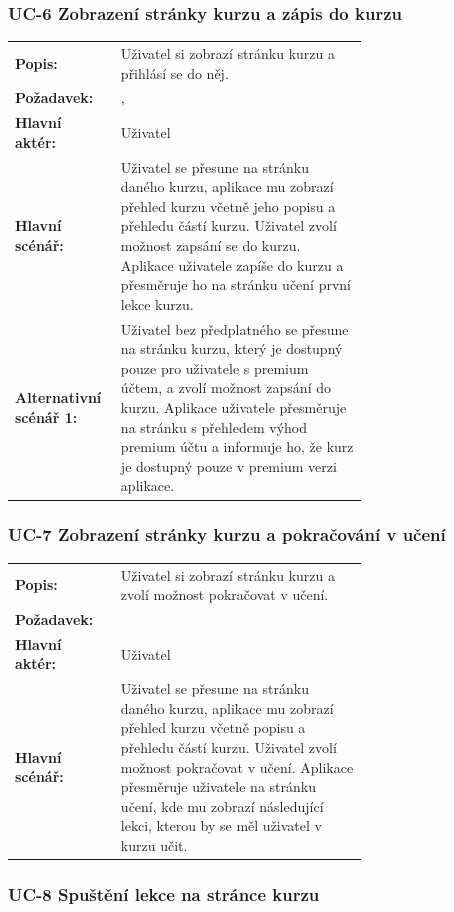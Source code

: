 \subsubsection{UC-6 Zobrazení stránky kurzu a zápis do kurzu}

\begin{tabular}{lp{0.7\linewidth}}
  \textbf{Popis:} & Uživatel si zobrazí stránku kurzu a přihlásí se do něj. \\
  \textbf{Požadavek:} & \nameref{sec:fp-course-page}, \nameref{sec:fp-subscription-system} \\
  \textbf{Hlavní aktér:} & Uživatel \\
  \textbf{Hlavní scénář:} & Uživatel se přesune na stránku daného kurzu, aplikace mu zobrazí přehled kurzu včetně jeho popisu a přehledu částí kurzu. Uživatel zvolí možnost zapsání se do kurzu. Aplikace uživatele zapíše do kurzu a přesměruje ho na stránku učení první lekce kurzu. \\
  \textbf{Alternativní scénář 1:} & Uživatel bez předplatného se přesune na stránku kurzu, který je dostupný pouze pro uživatele s premium účtem, a zvolí možnost zapsání do kurzu. Aplikace uživatele přesměruje na stránku s přehledem výhod premium účtu a informuje ho, že kurz je dostupný pouze v premium verzi aplikace. \\
\end{tabular}

\subsubsection{UC-7 Zobrazení stránky kurzu a pokračování v učení}

\begin{tabular}{lp{0.7\linewidth}}
  \textbf{Popis:} & Uživatel si zobrazí stránku kurzu a zvolí možnost pokračovat v učení. \\
  \textbf{Požadavek:} & \nameref{sec:fp-course-page} \\
  \textbf{Hlavní aktér:} & Uživatel \\
  \textbf{Hlavní scénář:} & Uživatel se přesune na stránku daného kurzu, aplikace mu zobrazí přehled kurzu včetně popisu a přehledu částí kurzu. Uživatel zvolí možnost pokračovat v učení. Aplikace přesměruje uživatele na stránku učení, kde mu zobrazí následující lekci, kterou by se měl uživatel v kurzu učit. \\
\end{tabular}

\subsubsection{UC-8 Spuštění lekce na stránce kurzu}

